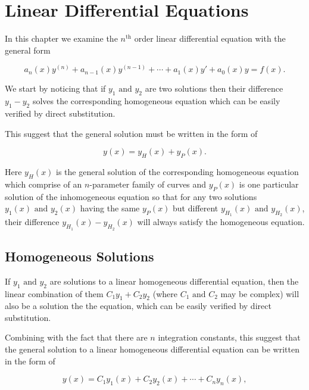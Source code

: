 \documentclass[english,a4paper,12pt]{report}
\begin{document}
\chapter{Linear Differential Equations} \label{linear} 

In this chapter we examine the \(n^{\text{th}} \) order linear differential equation with the general form

\begin{equation}
    a_{n}(x) y^{(n)} + a_{n-1}(x)y^{(n-1)} + \cdots + a_1 (x)y' + a_0 (x)y = f(x).    
\end{equation}

We start by noticing that if \(y_1 \text { and } y_2 \) are two solutions then their difference \(y_1 -y_2 \) solves the corresponding homogeneous equation which can be easily verified by direct substitution.

This suggest that the general solution must be written in the form of

\begin{equation}
    y(x) = y_{H}(x) + y_{P}(x).  
\end{equation}

Here \(y_{H}(x) \) is the general solution of the corresponding homogeneous equation which comprise of an \(n\)-parameter family of curves and \(y_{P}(x) \) is one particular solution of the inhomogeneous equation so that for any two solutions \(y_1 (x) \text { and } y_2 (x)\) having the same \(y_{P}(x) \) but different \(y_{H_1 }(x) \text { and } y_{H_2 }(x)  \), their difference \(y_{H_1 }(x) - y_{H_2 }(x)\) will always satisfy the homogeneous equation.     

\section{Homogeneous Solutions}

If \(y_1 \text { and } y_2  \) are solutions to a linear homogeneous differential equation, then the linear combination of them \(C_1 y_1 + C_2 y_2 \) (where \(C_1 \text { and } C_2\) may be complex) will also be a solution the the equation, which can be easily verified by direct substitution. 

Combining with the fact that there are \(n\) integration constants, this suggest that the general solution to a linear homogeneous differential equation can be written in the form of 

\begin{equation}
    y(x) = C_1 y_1 (x) + C_2 y_2 (x) + \cdots + C_{n}y_{n}(x),  
\end{equation}
\end{document}
